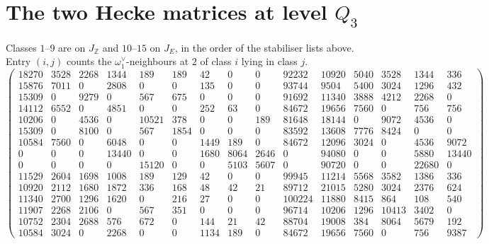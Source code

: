 \documentclass[11pt]{amsart}
\theoremstyle{definition}
\newcommand{\Z}{\mathbb{Z}}\newcommand{\Q}{\mathbb{Q}}\newcommand{\R}{\mathbb{R}}\newcommand{\A}{\mathbb{A}}\newcommand{\F}{\mathbb{F}}
\begin{document}
\section{The two Hecke matrices at level $Q_3$}\label{app:matrix}
Classes $1$--$9$ are on $J_\Z$ and $10$--$15$ on $J_E$, in the order of the stabiliser lists above. Entry $(i,j)$ counts the $\omega_1^\vee$-neighbours at $2$ of class $i$ lying in class $j$.
{\tiny\[\left(\begin{array}{rrrrrrrrrrrrrrr}
18270&3528&2268&1344&189&189&42&0&0&92232&10920&5040&3528&1344&336\\
15876&7011&0&2808&0&0&135&0&0&93744&9504&5400&3024&1296&432\\
15309&0&9279&0&567&675&0&0&0&91692&11340&3888&4212&2268&0\\
14112&6552&0&4851&0&0&252&63&0&84672&19656&7560&0&756&756\\
10206&0&4536&0&10521&378&0&0&189&81648&18144&0&9072&4536&0\\
15309&0&8100&0&567&1854&0&0&0&83592&13608&7776&8424&0&0\\
10584&7560&0&6048&0&0&1449&189&0&84672&12096&3024&0&4536&9072\\
0&0&0&13440&0&0&1680&8064&2646&0&94080&0&0&5880&13440\\
0&0&0&0&15120&0&0&5103&5607&0&90720&0&0&22680&0\\
11529&2604&1698&1008&189&129&42&0&0&99945&11214&5568&3582&1386&336\\
10920&2112&1680&1872&336&168&48&42&21&89712&21015&5280&3024&2376&624\\
11340&2700&1296&1620&0&216&27&0&0&100224&11880&8415&864&108&540\\
11907&2268&2106&0&567&351&0&0&0&96714&10206&1296&10413&3402&0\\
10752&2304&2688&576&672&0&144&21&42&88704&19008&384&8064&5679&192\\
10584&3024&0&2268&0&0&1134&189&0&84672&19656&7560&0&756&9387
\end{array}\right)\]}
\end{document}
